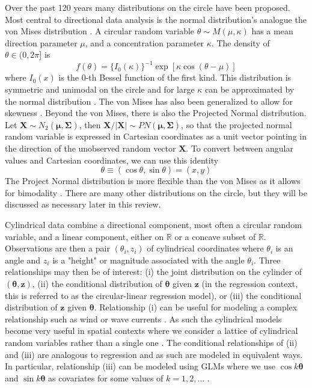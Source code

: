 
Over the past 120 years many distributions on the circle have been proposed. Most central to directional data analysis is the normal distribution's analogue the von Mises distribution \cite{mardia_directional_1999}. A circular random variable $\theta \sim M(\mu, \kappa)$ has a mean direction parameter $\mu$, and a concentration parameter $\kappa$. The density of $\theta \in (0, 2\pi]$ is \[f(\theta) = \{I_0(\kappa)\}^{-1} \exp\left[\kappa \cos(\theta -\mu)\right]\] where $I_0(x)$ is the 0-th Bessel function of the first kind. This distribution is symmetric and unimodal on the circle and for large $\kappa$ can be approximated by the normal distribution \cite{mardia_directional_1999}. The von Mises has also been generalized to allow for skewness \cite{abe_tractable_2017}. Beyond the von Mises, there is also the Projected Normal distribution. Let $\mathbf{X} \sim N_2(\bm{\mu}, \bm{\Sigma})$, then $\mathbf{X} / |\mathbf{X}| \sim PN(\bm{\mu}, \bm{\Sigma})$, so that the projected normal random variable is expressed in Cartesian coordinates as a unit vector pointing in the direction of the unobserved random vector $\mathbf{X}$. To convert between angular values and Cartesian coordinates, we can use this identity \[\theta \equiv (\cos\theta, \sin\theta) = (x,y)\] The Project Normal distribution is more flexible than the von Mises as it allows for bimodality \cite{mardia_directional_1999}. There are many other distributions on the circle, but they will be discussed as necessary later in this review.


Cylindrical data combine a directional component, most often a circular random variable, and a linear component, either on $\mathbb{R}$ or a concave subset of $\mathbb{R}$. Observations are then a pair $(\theta_i, z_i)$ of cylindrical coordinates where $\theta_i$ is an angle and $z_i$ is a "height" or magnitude associated with the angle $\theta_i$. Three relationships may then be of interest: (i) the joint distribution on the cylinder of $(\bm{\theta}, \mathbf{z})$, (ii) the conditional distribution of $\bm{\theta}$ given $\mathbf{z}$ (in the regression context, this is referred to as the circular-linear regression model), or (iii) the conditional distribution of $\mathbf{z}$ given $\bm{\theta}$. Relationship (i) can be useful for modeling a complex relationship such as wind or wave currents \cite{abe_tractable_2017}. As such the cylindrical models become very useful in spatial contexts where we consider a lattice of cylindrical random variables rather than a single one \cite{ranalli_segmentation_2018}. The conditional relationships of (ii) and (iii) are analogous to regression and as such are modeled in equivalent ways. In particular, relationship (iii) can be modeled using GLMs where we use $\cos k \bm{\theta}$ and $\sin k\bm{\theta}$ as covariates for some values of $k = 1,2,...$ \cite{mardia_model_1978} \cite{anderson-cook_second_2000}. 


